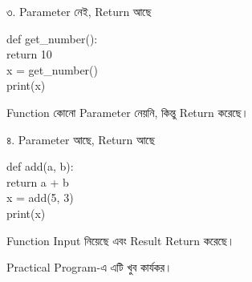 \begin{codeoutputbox}{৩. Parameter নেই, Return আছে}

\noindent
\begin{minipage}[t]{0.53\linewidth}
\codeheading

\begin{english}
\ttfamily
def get\_number():\\
\hspace*{4mm}return 10\\[0.5mm]
x = get\_number()\\
print(x)
\end{english}

\end{minipage}
\hfill
\begin{minipage}[t]{0.43\linewidth}
\outputheading

\begin{center}
\textenglish{}
\end{center}

Function কোনো Parameter নেয়নি,
কিন্তু
\textenglish{}
Return করেছে।

\end{minipage}

\end{codeoutputbox}

\begin{codeoutputbox}{৪. Parameter আছে, Return আছে}

\noindent
\begin{minipage}[t]{0.53\linewidth}
\codeheading

\begin{english}
\ttfamily
def add(a, b):\\
\hspace*{4mm}return a + b\\[0.5mm]
x = add(5, 3)\\
print(x)
\end{english}

\end{minipage}
\hfill
\begin{minipage}[t]{0.43\linewidth}
\outputheading

\begin{center}
\textenglish{}
\end{center}

Function Input নিয়েছে এবং Result Return করেছে।

Practical Program-এ এটি খুব কার্যকর।

\end{minipage}

\end{codeoutputbox}

